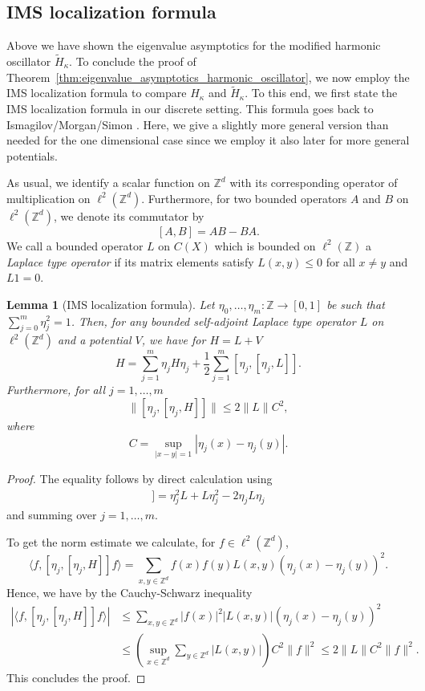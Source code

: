 \documentclass[12pt, reqno]{amsart}
\newtheorem{lemma}[theorem]{Lemma}
\theoremstyle{definition}
\numberwithin{equation}{section}
\newcommand{\Z}{{\mathbb Z}}
\begin{document}
\subsection{IMS localization formula}
Above we have shown the eigenvalue asymptotics for the modified harmonic oscillator $\tilde H_\kappa$. To conclude the proof of Theorem~\ref{thm:eigenvalue_asymptotics_harmonic_oscillator}, we now employ the IMS localization formula to compare $H_\kappa$ and $\tilde H_\kappa$.  To this end, we first state the IMS localization formula in our discrete setting. This formula goes back to Ismagilov/Morgan/Simon \cite[Chapter~3.1]{CyconFroeseKirschSimon}. Here, we give a slightly more general version than needed  for the one dimensional case since we employ it also later for more general potentials.

As usual, we identify a scalar function on $\Z^d$ with its corresponding operator of multiplication on $\ell^2(\Z^d)$. Furthermore, for two bounded operators $A$ and $B$ on $\ell^2(\Z^d)$,
we denote its commutator by
\[[A,B]=AB-BA.\]
We call a bounded operator $L$ on $C(X)$ which is bounded on  $\ell^2(\Z)$ a \emph{Laplace type operator} if its matrix elements satisfy $L(x,y)\le 0$ for all $x\neq y$ and $L1=0$.


\begin{lemma}[IMS localization formula]\label{lem:IMS}
Let $\eta_0,\ldots,\eta_m:\Z\to [0,1]$ be such that $\sum_{j=0}^m\eta_j^2=1$. Then, for any bounded self-adjoint Laplace type operator $L$ on $\ell^2(\Z^d)$ and a potential $V$, we have for $H=L+V$
\[H= \sum_{j=1}^m \eta_j H \eta_j +\frac12\sum_{j=1}^m [\eta_j,[\eta_j,L]].\]
Furthermore, for all $j=1,\ldots,m$
\[\| [\eta_j,[  \eta_j,H]]\|\leq 2\|L\| C^2,\]
where
\[C=\sup_{|x-y|=1} |\eta_j(x)-\eta_j(y)|.\]
\end{lemma}
\begin{proof}
The equality follows by direct calculation using
\begin{align*}
[\eta_j,[\eta_j,L]]=\eta_j^2 L + L \eta_j^2 - 2\eta_j L \eta_j
\end{align*}
and summing over $j=1,\ldots,m$.

To get the norm estimate we calculate, for $f\in \ell^2(\Z^d)$,
\[\langle f, [\eta_j,[  \eta_j,H]]f\rangle = \sum_{x,y\in \Z^d}  f(x)f(y) L(x,y)(\eta_j(x)-\eta_j(y))^2 .\]
Hence, we have by the Cauchy-Schwarz inequality
\begin{align*}
    |\langle f, [\eta_j,[  \eta_j,H]]f\rangle| &\leq \sum_{x,y\in \Z^d}  |f(x)|^2 |L(x,y)|(\eta_j(x)-\eta_j(y))^2 \\
    &\leq \left(\sup_{x\in \Z^d} \sum_{y\in \Z^d} |L(x,y)|\right)C^2 \|f\|^2\leq 2\|L\|C^2\|f\|^2.
\end{align*}
This concludes the proof.
\end{proof}
\end{document}
